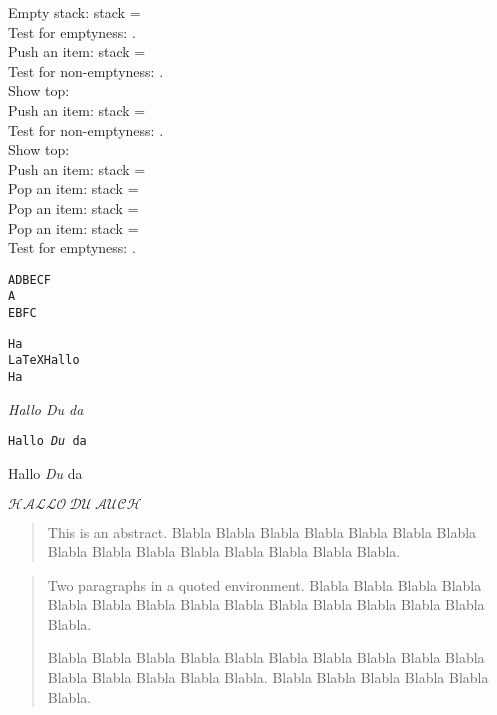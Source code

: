 \begin{lcHtmlBlock}
Empty stack: stack = \lciPrintStack{\mystack}\\
Test for emptyness: .\\
Push an item: stack = \lciPrintStack{\mystack}\\
Test for non-emptyness: .\\
Show top: \lciTopStack{\mystack}{\mytop}\mytop\\
Push an item: stack = \lciPrintStack{\mystack}\\
Test for non-emptyness: .\\
Show top: \lciTopStack{\mystack}{\mytop}\mytop\\
Push an item: stack = \lciPrintStack{\mystack}\\
\lciPopStack{\mystack}
Pop an item: stack = \lciPrintStack{\mystack}\\
\lciPopStack{\mystack}
Pop an item: stack = \lciPrintStack{\mystack}\\
\lciPopStack{\mystack}
Pop an item: stack = \lciPrintStack{\mystack}\\
Test for emptyness: .\\

\end{lcHtmlBlock}

\def\nn #1#2{A#1B#2C}

\begin{alltt}
\nn {D} {E} F
\nn {%} {
E} F

Ha
%
\LaTeX Hallo
%
Ha
\end{alltt}

{\it Hallo {\em Du} da}

{\tt Hallo {\em Du} da}

{\sc Hallo {\em Du} da}

$\mathcal{HALLO\ DU\ AUCH}$

\begin{abstract}
This is an abstract. Blabla Blabla Blabla Blabla
  Blabla Blabla Blabla Blabla Blabla Blabla Blabla Blabla Blabla
  Blabla Blabla.
\end{abstract}

\begin{quote}
  Two paragraphs in a quoted environment. Blabla Blabla Blabla Blabla
  Blabla Blabla Blabla Blabla Blabla Blabla Blabla Blabla Blabla
  Blabla Blabla.
  
  Blabla Blabla Blabla Blabla Blabla Blabla Blabla Blabla Blabla
  Blabla Blabla Blabla Blabla Blabla Blabla.  Blabla Blabla Blabla
  Blabla Blabla Blabla.
\end{quote}

